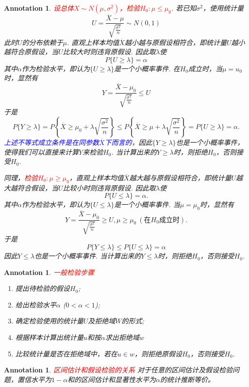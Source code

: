 \documentclass{article}
\newtheorem{annotation}[theorem]{Annotation}
\newcommand{\redt}[1]{\textcolor{red}{#1}}
\newcommand{\bluet}[1]{\textcolor{blue}{#1}}
\begin{document}
\begin{annotation}
\rm \redt{设总体$X \sim N(\mu,\sigma^2)$，检验$H_0: \mu \leq \mu_0$}. 若已知$\sigma^2$，使用统计量
$$
U = \frac{\overline{X}-\mu}{\sqrt{\frac{\sigma^2}{n}}} \sim N(0,1)
$$
此时$U$的分布依赖于$\mu$. 直观上样本均值$\overline{X}$越小越与原假设相符合，即统计量$U$越小越符合原假设，当$U$比较大时则违背原假设. 因此取$\lambda$使
$$
P\{U \geq \lambda\} = \alpha
$$
其中$\alpha$作为检验水平，即认为$\{U \geq \lambda\}$是一个小概率事件. 在$H_0$成立时，当$\mu = u_0$时，显然有
$$
Y = \frac{\overline{X}-\mu_0}{\sqrt{\frac{\sigma^2}{n}}} \leq U
$$
于是
$$
P\{Y \geq \lambda \} = P\left\{\overline{X} \geq \mu_0 + \lambda\sqrt{\frac{\sigma^2}{n}}\right\} \leq P\left\{ \overline{X} \geq \mu + \lambda\sqrt{\frac{\sigma^2}{n}} \right\} = P\{U \geq \lambda\} = \alpha.
$$ 
\bluet{上述不等式成立条件是在同参数$\overline{X}$下而言的}，因此$\{Y \geq \lambda\}$也是一个小概率事件，使得我们可以直接来计算$Y$来检验$H_0$. 当计算出来的$Y \geq \lambda$时，则拒绝$H_0$，否则接受$H_0$. 

同理，\redt{检验$H_0: \mu \geq \mu_0$}，直观上样本均值$\overline{X}$越大越与原假设相符合，即统计量$U$越大越符合假设，当$U$比较小时则违背原假设. 因此取$\lambda$使
$$
P\{U \leq \lambda \} = \alpha.
$$
其中$\alpha$作为检验水平，即认为$\{U \leq \lambda\}$是一个小概率事件. 当$\mu=\mu_0$时，显然有
$$
Y = \frac{\overline{X}-\mu_0}{\sqrt{\frac{\sigma^2}{n}}} \geq U , \mu \geq \mu_0  ~(\text{在$H_0$成立时}).
$$
于是
$$
P\{Y \leq \lambda \} \leq P\{U \leq \lambda\} = \alpha
$$
因此${Y \leq \lambda}$也是一个小概率事件. 当计算出来的$Y \leq \lambda$时，则拒绝$H_0$，否则接受$H_0$.
\end{annotation}

\begin{annotation}
\rm \redt{一般检验步骤}
\begin{enumerate}
	\item 提出待检验的假设$H_0$;
	\item 给出检验水平$\alpha$ ($0 < \alpha < 1$);
	\item 确定检验使用的统计量$U$及拒绝域$W$的形式;
	\item 根据样本计算出统计量$u$和按$\alpha$求出拒绝域$w$
	\item 比较统计量是否在拒绝域中，若在$u \in w $，则拒绝原假设$H_0$，否则接受$H_0$.
\end{enumerate}
\end{annotation}

\begin{annotation}
\rm \redt{区间估计和假设检验的关系} 对于任意的区间估计及假设检验问题，置信水平为$1-\alpha$和的区间估计和显著性水平为$\alpha$的统计推断等价。
\end{annotation}
\end{document}
